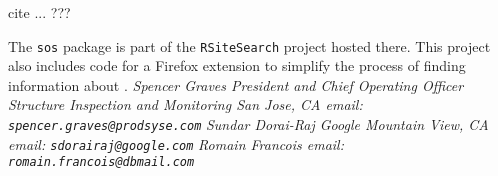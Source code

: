 cite ... ???


The {\tt sos} package is part of the {\tt RSiteSearch} project
hosted there.  This project also includes code for a Firefox
extension to simplify the process of finding information about
\R{}.
\newline \newline
\emph{Spencer Graves \newline
President and Chief Operating Officer \newline
Structure Inspection and Monitoring \newline
San Jose, CA \newline
email:  {\tt spencer.graves@prodsyse.com} }
\newline \newline
\emph{Sundar Dorai-Raj \newline
Google \newline
Mountain View, CA \newline
email:  {\tt sdorairaj@google.com} }
\newline \newline
\emph{Romain Francois \newline
\newline
\newline
email:  {\tt romain.francois@dbmail.com} }

